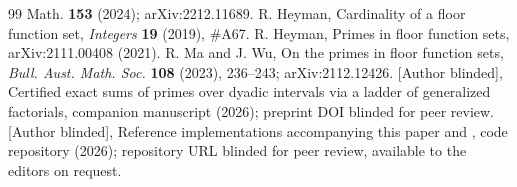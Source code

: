 \documentclass[11pt]{article}
\theoremstyle{remark}
\begin{document}
\begin{thebibliography}{99}
{Math.} \textbf{153} (2024); arXiv:2212.11689.
 R. Heyman, Cardinality of a floor function set, \emph{Integers} \textbf{19} (2019),
\#A67.
 R. Heyman, Primes in floor function sets, arXiv:2111.00408 (2021).
 R. Ma and J. Wu, On the primes in floor function sets, \emph{Bull. Aust. Math. Soc.}
\textbf{108} (2023), 236--243; arXiv:2112.12426.
 [Author blinded], Certified exact sums of primes over dyadic intervals via a
ladder of generalized factorials, companion manuscript (2026); preprint DOI blinded for peer review.
 [Author blinded], Reference implementations accompanying this paper and \cite{Companion},
code repository (2026); repository URL blinded for peer review, available to the editors on request.
\end{thebibliography}
\end{document}
